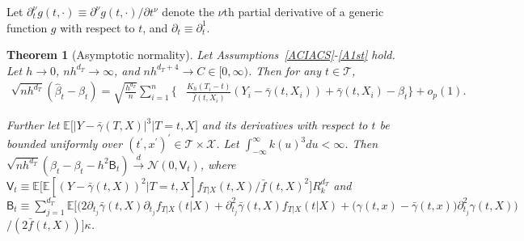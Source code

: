 \documentclass[lettersize, 12pt]{article}
\newtheorem{theorem}{Theorem}
\begin{document}
Let $\partial_t^\nu g(t, \cdot) \equiv \partial^\nu g(t, \cdot)/\partial t^\nu$ denote the $\nu$th partial derivative of a generic function $g$ with respect to $t$, and $\partial_t \equiv \partial_t^1$.
\begin{theorem}[Asymptotic normality] 
Let Assumptions~\ref{ACIACS}-\ref{A1st} hold.
Let $h \rightarrow 0$, $nh^{d_T} \rightarrow\infty$, and $nh^{d_T+4} \rightarrow C \in [0,\infty)$.
Then for any $t\in\mathcal{T}$, 
\begin{align}
\sqrt{nh^{d_T}} \left(\hat \beta_t - \beta_t\right) = \sqrt{\frac{h^{d_T}}{n}} \sum_{i=1}^n\bigg\{
&\frac{K_h(T_i-t)}{\bar f(t,X_i)} (Y_i - \bar\gamma(t, X_i)) 
+  \bar\gamma(t, X_i) - \beta_t  \bigg\}
+ o_p(1). \label{EIF}
\end{align}

Further let $\mathbb{E}\big[|Y-\bar\gamma(T,X)|^3\big|T=t, X\big]$ and its derivatives with respect to $t$ be bounded uniformly over $(t^\prime,x^\prime)^\prime\in \mathcal{T}\times\mathcal{X}$.
Let $\int_{-\infty}^\infty k(u)^3du < \infty$.
Then $\sqrt{nh^{d_T}} \left(\hat \beta_t - \beta_t - h^2 \mathsf{B}_t\right) \stackrel{d}{\longrightarrow} \mathcal{N}\left(0, \mathsf{V}_t\right)$,
where  
$\mathsf{V}_t \equiv \mathbb{E}\big[ \mathbb{E}[(Y-\bar\gamma(t,X))^2|T=t, X] f_{T|X}(t,X)/\bar f(t,X)^2\big] R_k^{d_T}$
and 
\\
$\mathsf{B}_t \equiv 
\sum_{j=1}^{d_T} \mathbb{E}\Big[
\Big(
2\partial_{t_j} \bar{\gamma}(t,X)\partial_{t_j} f_{T|X}(t|X)
+ \partial_{t_j}^2 \bar{\gamma}(t,X) f_{T|X}(t|X) + 
\big( \gamma(t,x) - \bar\gamma(t,x) \big)
\partial^2_{t_j} {\gamma}(t, X)
\Big)$\\$\Big/(2\bar f(t,X))
\Big]  \kappa$.
\label{TIF}
 \end{theorem}
\end{document}
